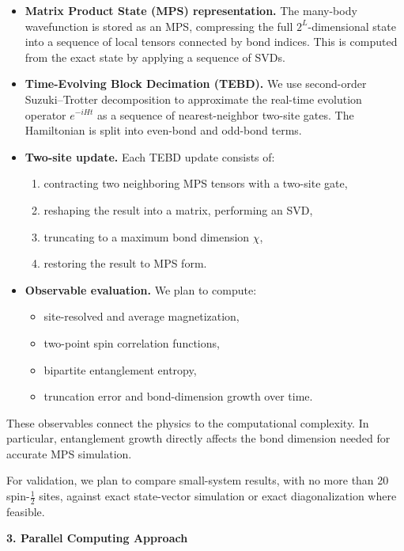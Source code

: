 \documentclass[11pt]{article}
\begin{document}
\begin{itemize}
    \item \textbf{Matrix Product State (MPS) representation.} The many-body wavefunction is stored as an MPS, compressing the full $2^L$-dimensional state into a sequence of local tensors connected by bond indices. This is computed from the exact state by applying a sequence of SVDs.

    \item \textbf{Time-Evolving Block Decimation (TEBD).} We use second-order Suzuki--Trotter decomposition to approximate the real-time evolution operator $e^{-iHt}$ as a sequence of nearest-neighbor two-site gates. The Hamiltonian is split into even-bond and odd-bond terms.

    \item \textbf{Two-site update.} Each TEBD update consists of:
    \begin{enumerate}
        \item contracting two neighboring MPS tensors with a two-site gate,
        \item reshaping the result into a matrix, performing an SVD,
        \item truncating to a maximum bond dimension $\chi$,
        \item restoring the result to MPS form.
    \end{enumerate}

    \item \textbf{Observable evaluation.} We plan to compute:
    \begin{itemize}
        \item site-resolved and average magnetization,
        \item two-point spin correlation functions,
        \item bipartite entanglement entropy,
        \item truncation error and bond-dimension growth over time.
    \end{itemize}
\end{itemize}

These observables connect the physics to the computational complexity. In particular, entanglement growth directly affects the bond dimension needed for accurate MPS simulation.

For validation, we plan to compare small-system results, with no more than 20 spin-$\tfrac12$ sites, against exact state-vector simulation or exact diagonalization where feasible.

\vspace{0.4em}
\textbf{3. Parallel Computing Approach}
\end{document}
